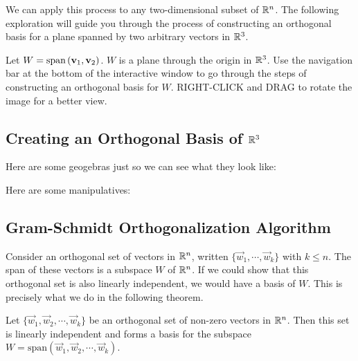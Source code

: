 \documentclass{ximera}
\begin{document}
We can apply this process to any two-dimensional subset of $\mathbb{R}^n$.  The following exploration will guide you through the process of constructing an orthogonal basis for a plane spanned by two arbitrary vectors in $\mathbb{R}^3$.
\begin{exploration}
Let $W =\mbox{span}\left({\bf v}_1,{\bf v}_2\right)$. $W$ is a plane through the origin in $\mathbb{R}^3$.  Use the navigation bar at the bottom of the interactive window to go through the steps of constructing an orthogonal basis for $W$.  RIGHT-CLICK and DRAG to rotate the image for a better view.
    \begin{center}
\end{center}

\end{exploration}

\subsection*{Creating an Orthogonal Basis of $\mathbb{R}^3$}


Here are some geogebras just so we can see what they look like:
\begin{exploration}
Here are some manipulatives:
\begin{center}
\end{center}
\end{exploration}







\subsection*{Gram-Schmidt Orthogonalization Algorithm}

Consider an orthogonal set of vectors in $\mathbb{R}^n$, written $\{
\vec{w}_1, \cdots, \vec{w}_k \}$ with $k \leq n$. The span of these
vectors is a subspace $W$ of $\mathbb{R}^n$.   If we
could show that this orthogonal set is also linearly independent, we
would have a basis of $W$. This is precisely what we do in the following theorem.

\begin{theorem}\label{orthbasis}
Let $ \{ \vec{w}_1, \vec{w}_2, \cdots, \vec{w}_k \}$ be an
orthogonal set of non-zero vectors in $\mathbb{R}^n$. Then this set is
linearly independent and forms a basis for the subspace $W =
\mbox{span}\left( \vec{w}_1, \vec{w}_2, \cdots, \vec{w}_k \right)$.
\end{theorem}
\end{document}
